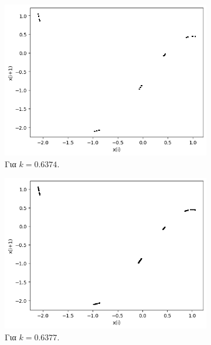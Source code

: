 \begin{figure}[h!]
\begin{subfigure}[b]{0.4\textwidth}
		\includegraphics[width=\textwidth]{LateX images/graphs q21/g6}
		\caption{Για $k=0.6374$.}
		\label{f:k106}
	\end{subfigure}
	\hfill
	\begin{subfigure}[b]{0.4\textwidth}
		\centering
		\includegraphics[width=\textwidth]{LateX images/graphs q21/g7}
		\caption{Για $k=0.6377$.}
		\label{f:k107}
	\end{subfigure}
	\hfill
	\begin{subfigure}[b]{0.4\textwidth}
		\centering

\end{subfigure}
\end{figure}
